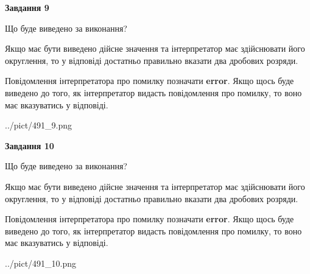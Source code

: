 \documentclass[12pt, ukrainian]{article}
\begin{document}
{\begin {Large}
{\begin {center}\textbf{Завдання 9}\end {center}}\par
Що буде виведено за виконання? \par

Якщо має бути виведено дійсне значення та інтерпретатор має здійснювати його округлення, 
то у відповіді достатньо правильно вказати два дробових розряди.

Повідомлення інтерпретатора про помилку позначати \textbf{error}.
Якщо щось буде виведено до того, як інтерпретатор видасть повідомлення про помилку, 
то воно має вказуватись у відповіді. \par

\begin{center}
	{../pict/491_9.png}
\end{center}
\newpage

{\begin {center}\textbf{Завдання 10}\end {center}}\par
Що буде виведено за виконання? \par

Якщо має бути виведено дійсне значення та інтерпретатор має здійснювати його округлення, 
то у відповіді достатньо правильно вказати два дробових розряди.

Повідомлення інтерпретатора про помилку позначати \textbf{error}.
Якщо щось буде виведено до того, як інтерпретатор видасть повідомлення про помилку, 
то воно має вказуватись у відповіді. \par

\begin{center}
	{../pict/491_10.png}
\end{center}
\newpage

\end {Large}}
\end{document}
